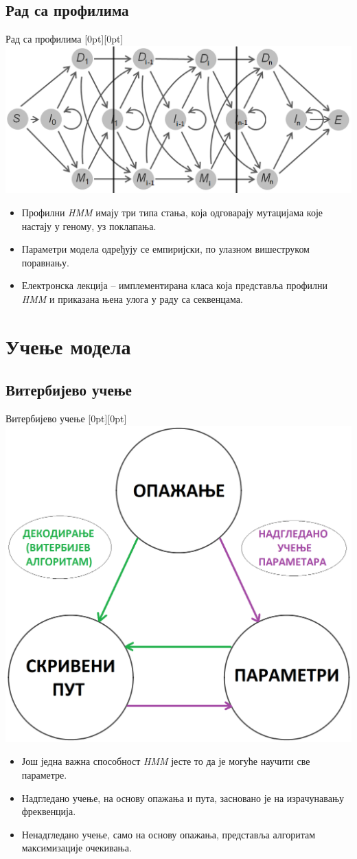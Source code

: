 \documentclass[hyperref={bookmarks=false}]{beamer}
\newcommand{\lenitem}[2][.43\linewidth]{\parbox[t]{#1}{\strut #2\strut}}
\begin{document}
\subsection{Рад са профилима}
\begin{frame}{Рад са профилима}
\mbox{}\hfill\raisebox{-\height}[0pt][0pt]{\includegraphics[width=.5\linewidth]{prof_hmm.png}}
\vspace*{-\baselineskip}

\begin{itemize}
\item \lenitem{Профилни \textit{HMM} имају три типа стања, која одговарају мутацијама које настају у геному, уз поклапања.}
\item \lenitem{Параметри модела одређују се емпиријски, по улазном вишеструком поравнању.}
\item Електронска лекција -- имплементирана класа која представља профилни \textit{HMM} и приказана њена улога у раду са секвенцама.
\end{itemize}
\end{frame}

\section{Учење модела}
\subsection{Витербијево учење}
\begin{frame}{Витербијево учење}
\mbox{}\hfill\raisebox{-\height}[0pt][0pt]{\includegraphics[width=.5\linewidth]{ema.png}}
\vspace*{-\baselineskip}

\begin{itemize}
\item \lenitem{Још једна важна способност \textit{HMM} јесте то да је могуће научити све параметре.}
\item \lenitem{Надгледано учење, на основу опажања и пута, засновано је на израчунавању фреквенција.}
\item \lenitem{Ненадгледано учење, само на основу опажања, представља алгоритам максимизације очекивања.}
\end{itemize}
\end{frame}
\end{document}
